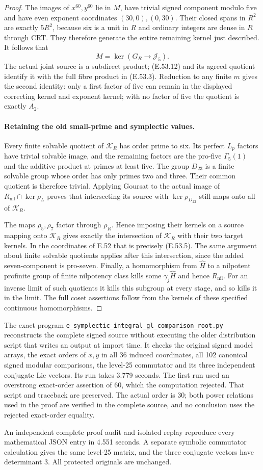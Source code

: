 \begin{proof}
The images of $x^{60},y^{60}$ lie in $M$, have
trivial signed component modulo five and have
even exponent coordinates $(30,0),(0,30)$.
Their closed spans in $R^2$ are exactly $5R^2$,
because six is a unit in $R$ and ordinary integers
are dense in $R$ through CRT.
They therefore generate the entire remaining
kernel just described. It follows that
\[
                       M=\ker(G_R\to\mathcal J_5).
 \tag{E.53.12}
\]
The actual joint source is a subdirect product;
\textup{(E.53.12)} and its agreed quotient identify
it with the full fibre product in
\textup{(E.53.3)}.
Reduction to any finite $m$ gives the second
identity: only a first factor of five can remain
in the displayed correcting kernel and exponent
kernel; with no factor of five the quotient is
exactly $A_2$.

\paragraph{Retaining the old small-prime and symplectic values.}
Every finite solvable quotient of $\mathcal K_R$
has order prime to six. Its perfect $L_p$ factors
have trivial solvable image, and the remaining
factors are the pro-five $\Gamma_5(1)$ and the
additive product at primes at least five.
The group $D_{23}$ is a finite solvable group whose
order has only primes two and three.
Their common quotient is therefore trivial.
Applying Goursat to the actual image of
$R_{\mathrm{nil}}\cap\ker\rho_L$ proves that
intersecting its source with $\ker\rho_{D_{23}}$
still maps onto all of $\mathcal K_R$.

The maps $\rho_5,\rho_7$ factor through $\rho_R$.
Hence imposing their kernels on a source mapping
onto $\mathcal K_R$ gives exactly the intersection
of $\mathcal K_R$ with their two target kernels.
In the coordinates of E.52 that is precisely
\textup{(E.53.5)}.
The same argument about finite solvable quotients
applies after this intersection, since the added
seven-component is pro-seven.
Finally, a homomorphism from $\widehat H$ to a
nilpotent profinite group of finite nilpotency
class kills some $\gamma_j\widehat H$ and hence
$R_{\mathrm{nil}}$. For an inverse limit of such
quotients it kills this subgroup at every stage,
and so kills it in the limit.
The full coset assertions follow from the kernels
of these specified continuous homomorphisms.
\end{proof}

The exact program
\texttt{e\_symplectic\_integral\_gl\_comparison\_root.py}
reconstructs the complete signed source without executing
the older distribution script that writes an output at
import time. It checks the original signed model arrays,
the exact orders of $x,y$ in all 36 induced coordinates,
all 102 canonical signed modular comparisons, the
level-25 commutator and its three independent conjugate
Lie vectors. Its run takes 3.779 seconds.
The first run used an overstrong exact-order assertion
of 60, which the computation rejected. That script and
traceback are preserved. The actual order is 30; both
power relations used in the proof are verified in the
complete source, and no conclusion uses the rejected
exact-order equality.

An independent complete proof audit and isolated replay reproduce
every mathematical JSON entry in 4.551 seconds. A separate
symbolic commutator calculation gives the same level-25
matrix, and the three conjugate vectors have determinant
$3$. All protected originals are unchanged.
